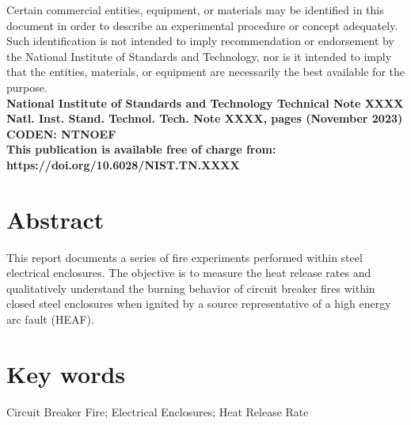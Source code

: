 \documentclass[12pt]{article}
\newcommand{\pubnumber}{XXXX}
\newcommand{\DOI}{https://doi.org/10.6028/NIST.TN.XXXX}
\newcommand{\monthyear}{November 2023}
\begin{document}
\begin{titlepage}
\begin{flushright}
\footnotesize  Certain commercial entities, equipment, or materials may be identified in this document in order to describe an experimental procedure or concept adequately. Such identification is not intended to imply recommendation or endorsement by the National Institute of Standards and Technology, nor is it intended to imply that the entities, materials, or equipment are necessarily the best available for the purpose.\\
\vfill
\normalsize \textbf{National Institute of Standards and Technology Technical Note \pubnumber\\
Natl. Inst. Stand. Technol. Tech. Note \pubnumber, \pageref{LastPage} pages (\monthyear)} \\
\textbf{CODEN: NTNOEF}\\
\vspace{12pt}
\textbf{This publication is available free of charge from: \DOI}
\vfill
\end{flushright}
\end{titlepage}


\section*{Abstract}

\normalsize This report documents a series of fire experiments performed within steel electrical enclosures. The objective is to measure the heat release rates and qualitatively understand the burning behavior of circuit breaker fires within closed steel enclosures when ignited by a source representative of a high energy arc fault (HEAF).  \\

\section*{Key words}
\normalsize Circuit Breaker Fire; Electrical Enclosures; Heat Release Rate\\
\pagebreak
\begin{center}
 \tableofcontents
 \listoftables
 \listoffigures
\end{center}
\end{document}

